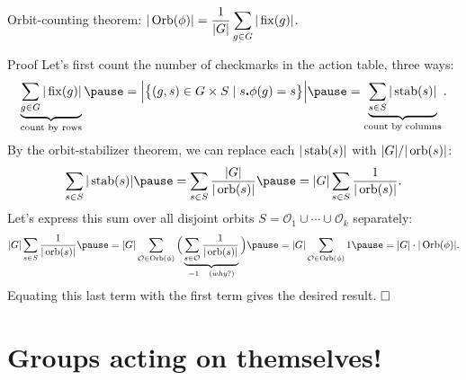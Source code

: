 \documentclass[8pt, handout]{beamer}
\newcommand{\Pause}{\pause}      %
\begin{document}

\begin{frame}{Orbit-counting theorem:
    $\displaystyle|\operatorname{Orb}(\phi)|=\frac{1}{|G|}\sum\limits_{g\in G}|\operatorname{fix}(g)|$.} 
  
  \begin{exampleblock}{Proof} \Pause
    Let's first count the number of checkmarks in the action table, three ways: 
    \[
    \underbrace{\sum_{g\in G}|\fix(g)|}_{\text{count by rows}}\Pause
    =\Big|\big\{(g,s)\in G\times S\mid s\Dot\phi(g)=s\big\}\Big|
    \Pause=\underbrace{\sum_{s\in S}|\stab(s)|}_{\text{count by columns}}.
    \]
    \pause By the orbit-stabilizer theorem, we can replace each
    $|\operatorname{stab}(s)|$ with $|G|/|\operatorname{orb}(s)|$:
    \[
    \sum_{s\in S}|\stab(s)|\pause=\sum_{s\in S}\frac{|G|}{|\orb(s)|}
    \pause=|G|\sum_{s\in S}\frac{1}{|\orb(s)|}.
    \]
    \pause Let's express this sum over all disjoint orbits
    $S=\mathcal{O}_1\cup\cdots\cup\mathcal{O}_k$ separately:
    \[
    |G|\sum_{s\in S}\frac{1}{|\orb(s)|}
    \pause=|G|\sum_{\mathcal{O}\in\Orb(\phi)}\Big(
    \underbrace{\sum_{s\in\mathcal{O}}\frac{1}{|\orb(s)|}}_{=1\quad\text(why?)}\Big)
    \pause=|G|\sum_{\mathcal{O}\in\Orb(\phi)}1\pause=|G|\cdot|\Orb(\phi)|.
    \]
    \pause Equating this last term with the first term gives the desired
    result. $\hfill\Box$    
  \end{exampleblock}
  
\end{frame}


\section{Groups acting on themselves!}

\end{document}

